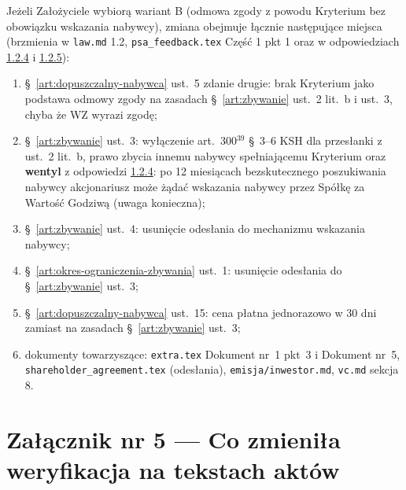 \documentclass[12pt,a4paper]{report}
\begin{document}
Jeżeli Założyciele wybiorą wariant B (odmowa zgody z powodu Kryterium bez obowiązku wskazania nabywcy), zmiana obejmuje łącznie następujące miejsca (brzmienia w \texttt{law.md} 1.2, \texttt{psa\_feedback.tex} Część 1 pkt 1 oraz w odpowiedziach \hyperref[memo:1.2.4]{1.2.4} i \hyperref[memo:1.2.5]{1.2.5}):
\begin{enumerate}
  \item §~\ref{art:dopuszczalny-nabywca} ust.~5 zdanie drugie: brak Kryterium jako podstawa odmowy zgody na zasadach §~\ref{art:zbywanie} ust.~2 lit.~b i ust.~3, chyba że WZ wyrazi zgodę;
  \item §~\ref{art:zbywanie} ust.~3: wyłączenie art.~300$^{39}$ §~3--6 KSH dla przesłanki z ust.~2 lit.~b, prawo zbycia innemu nabywcy spełniającemu Kryterium oraz \textbf{wentyl} z odpowiedzi \hyperref[memo:1.2.4]{1.2.4}: po 12 miesiącach bezskutecznego poszukiwania nabywcy akcjonariusz może żądać wskazania nabywcy przez Spółkę za Wartość Godziwą (uwaga konieczna);
  \item §~\ref{art:zbywanie} ust.~4: usunięcie odesłania do mechanizmu wskazania nabywcy;
  \item §~\ref{art:okres-ograniczenia-zbywania} ust.~1: usunięcie odesłania do §~\ref{art:zbywanie} ust.~3;
  \item §~\ref{art:dopuszczalny-nabywca} ust.~15: cena płatna jednorazowo w 30 dni zamiast na zasadach §~\ref{art:zbywanie} ust.~3;
  \item dokumenty towarzyszące: \texttt{extra.tex} Dokument nr~1 pkt~3 i Dokument nr~5, \texttt{shareholder\_agreement.tex} (odesłania), \texttt{emisja/inwestor.md}, \texttt{vc.md} sekcja 8.
\end{enumerate}

\clearpage
\section*{Załącznik nr 5 --- Co zmieniła weryfikacja na tekstach aktów}
\end{document}
